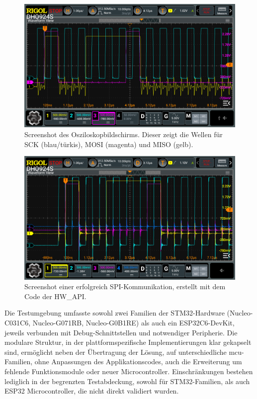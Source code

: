 \begin{figure}[H]
	\includegraphics[width=\textwidth]{Pics/oszi_cube_spi_example.png}
	\caption{Screenshot des Osziloskopbildschirms. Dieser zeigt die Wellen für SCK (blau/türkis), MOSI (magenta) und MISO (gelb).}
	\label{fig:oszi_cube_spi_example}
\end{figure}



\begin{figure}[H]
	\includegraphics[width=\textwidth]{Pics/spi_signal_test.png}
	\caption{Screenshot einer erfolgreich SPI-Kommunikation, erstellt mit dem Code der HW\_API.}
	\label{fig:oszi_spi_signal_test}
\end{figure}

\clearpage

Die Testumgebung umfasste sowohl zwei Familien der STM32-Hardware (Nucleo-C031C6, Nucleo-G071RB, Nucleo-G0B1RE) als auch ein ESP32C6-DevKit, jeweils verbunden mit Debug-Schnittstellen und notwendiger Peripherie.
Die modulare Struktur, in der plattformspezifische Implementierungen klar gekapselt sind, ermöglicht neben der Übertragung der Lösung, auf unterschiedliche \gls{mcu}-Familien, ohne Anpassungen des Applikationscodes, auch die Erweiterung um fehlende Funktionsmodule oder neuer Microcontroller.
Einschränkungen bestehen lediglich in der begrenzten Testabdeckung, sowohl für STM32-Familien, als auch ESP32 Microcontroller, die nicht direkt validiert wurden.


